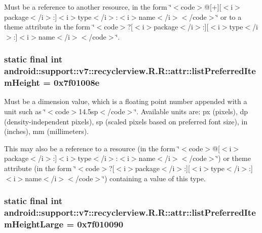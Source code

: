 Must be a reference to another resource, in the form \char`\"{}$<$code$>$@\mbox{[}+\mbox{]}\mbox{[}$<$i$>$package$<$/i$>$:\mbox{]}$<$i$>$type$<$/i$>$:$<$i$>$name$<$/i$>$$<$/code$>$\char`\"{} or to a theme attribute in the form \char`\"{}$<$code$>$?\mbox{[}$<$i$>$package$<$/i$>$:\mbox{]}\mbox{[}$<$i$>$type$<$/i$>$:\mbox{]}$<$i$>$name$<$/i$>$$<$/code$>$\char`\"{}. \hypertarget{classandroid_1_1support_1_1v7_1_1recyclerview_1_1_r_1_1attr_eb937b4a1f0f1f0570ba4f7e18c845f6}{
\subsubsection[{listPreferredItemHeight}]{\setlength{\rightskip}{0pt plus 5cm}static final int android::support::v7::recyclerview.R.R::attr::listPreferredItemHeight = 0x7f01008e}}
\label{classandroid_1_1support_1_1v7_1_1recyclerview_1_1_r_1_1attr_eb937b4a1f0f1f0570ba4f7e18c845f6}


Must be a dimension value, which is a floating point number appended with a unit such as \char`\"{}$<$code$>$14.5sp$<$/code$>$\char`\"{}. Available units are: px (pixels), dp (density-independent pixels), sp (scaled pixels based on preferred font size), in (inches), mm (millimeters). 

This may also be a reference to a resource (in the form \char`\"{}$<$code$>$@\mbox{[}$<$i$>$package$<$/i$>$:\mbox{]}$<$i$>$type$<$/i$>$:$<$i$>$name$<$/i$>$$<$/code$>$\char`\"{}) or theme attribute (in the form \char`\"{}$<$code$>$?\mbox{[}$<$i$>$package$<$/i$>$:\mbox{]}\mbox{[}$<$i$>$type$<$/i$>$:\mbox{]}$<$i$>$name$<$/i$>$$<$/code$>$\char`\"{}) containing a value of this type. \hypertarget{classandroid_1_1support_1_1v7_1_1recyclerview_1_1_r_1_1attr_81c018c133dc88c99e20d6e0bbe3027e}{
\subsubsection[{listPreferredItemHeightLarge}]{\setlength{\rightskip}{0pt plus 5cm}static final int android::support::v7::recyclerview.R.R::attr::listPreferredItemHeightLarge = 0x7f010090}}
\label{classandroid_1_1support_1_1v7_1_1recyclerview_1_1_r_1_1attr_81c018c133dc88c99e20d6e0bbe3027e}


